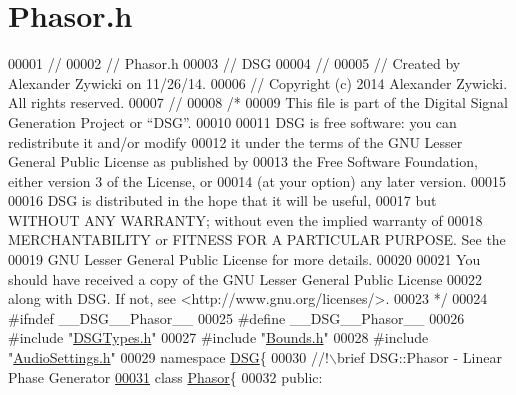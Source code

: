 \hypertarget{_phasor_8h_source}{\section{Phasor.\+h}
\label{_phasor_8h_source}
}

\begin{DoxyCode}
00001 \textcolor{comment}{//}
00002 \textcolor{comment}{//  Phasor.h}
00003 \textcolor{comment}{//  DSG}
00004 \textcolor{comment}{//}
00005 \textcolor{comment}{//  Created by Alexander Zywicki on 11/26/14.}
00006 \textcolor{comment}{//  Copyright (c) 2014 Alexander Zywicki. All rights reserved.}
00007 \textcolor{comment}{//}
00008 \textcolor{comment}{/*}
00009 \textcolor{comment}{ This file is part of the Digital Signal Generation Project or “DSG”.}
00010 \textcolor{comment}{}
00011 \textcolor{comment}{ DSG is free software: you can redistribute it and/or modify}
00012 \textcolor{comment}{ it under the terms of the GNU Lesser General Public License as published by}
00013 \textcolor{comment}{ the Free Software Foundation, either version 3 of the License, or}
00014 \textcolor{comment}{ (at your option) any later version.}
00015 \textcolor{comment}{}
00016 \textcolor{comment}{ DSG is distributed in the hope that it will be useful,}
00017 \textcolor{comment}{ but WITHOUT ANY WARRANTY; without even the implied warranty of}
00018 \textcolor{comment}{ MERCHANTABILITY or FITNESS FOR A PARTICULAR PURPOSE.  See the}
00019 \textcolor{comment}{ GNU Lesser General Public License for more details.}
00020 \textcolor{comment}{}
00021 \textcolor{comment}{ You should have received a copy of the GNU Lesser General Public License}
00022 \textcolor{comment}{ along with DSG.  If not, see <http://www.gnu.org/licenses/>.}
00023 \textcolor{comment}{ */}
00024 \textcolor{preprocessor}{#ifndef \_\_DSG\_\_Phasor\_\_}
00025 \textcolor{preprocessor}{#define \_\_DSG\_\_Phasor\_\_}
00026 \textcolor{preprocessor}{#include "\hyperlink{_d_s_g_types_8h}{DSGTypes.h}"}
00027 \textcolor{preprocessor}{#include "\hyperlink{_bounds_8h}{Bounds.h}"}
00028 \textcolor{preprocessor}{#include "\hyperlink{_audio_settings_8h}{AudioSettings.h}"}
00029 \textcolor{keyword}{namespace }\hyperlink{namespace_d_s_g}{DSG}\{\textcolor{comment}{}
00030 \textcolor{comment}{    //!\(\backslash\)brief DSG::Phasor - Linear Phase Generator}
\hypertarget{_phasor_8h_source_l00031}{}\hyperlink{class_d_s_g_1_1_phasor}{00031} \textcolor{comment}{}    \textcolor{keyword}{class }\hyperlink{class_d_s_g_1_1_phasor}{Phasor}\{
00032     \textcolor{keyword}{public}:

\end{DoxyCode}
